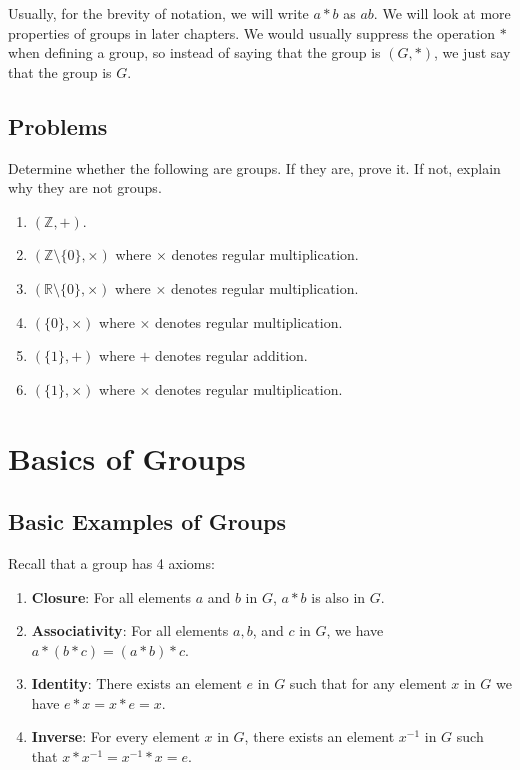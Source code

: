 Usually, for the brevity of notation, we will write $a \ast b$ as $ab$. We will look at more properties of groups in later chapters. We would usually suppress the operation $\ast$ when defining a group, so instead of saying that the group is $(G, \ast)$, we just say that the group is $G$.

\newpage

\section{Problems}
\begin{problem}
Determine whether the following are groups. If they are, prove it. If not, explain why they are not groups.
\begin{enumerate}[label=(\alph*)]
    \item $(\mathbb{Z}, +)$.
    \item $(\mathbb{Z} \setminus \{0\}, \times)$ where $\times$ denotes regular multiplication.
    \item $(\mathbb{R} \setminus \{0\}, \times)$ where $\times$ denotes regular multiplication.
    \item $(\{0\}, \times)$ where $\times$ denotes regular multiplication.
    \item $(\{1\}, +)$ where $+$ denotes regular addition.
    \item $(\{1\}, \times)$ where $\times$ denotes regular multiplication.
\end{enumerate}
\end{problem}

\chapter{Basics of Groups}
\section{Basic Examples of Groups}
Recall that a group has 4 axioms:
\begin{enumerate}
    \item \textbf{Closure}: For all elements $a$ and $b$ in $G$, $a \ast b$ is also in $G$.
    \item \textbf{Associativity}: For all elements $a, b$, and $c$ in $G$, we have $a \ast (b \ast c) = (a \ast b) \ast c$.
    \item \textbf{Identity}: There exists an element $e$ in $G$ such that for any element $x$ in $G$ we have $e \ast x = x \ast e = x$.
    \item \textbf{Inverse}: For every element $x$ in $G$, there exists an element $x^{-1}$ in $G$ such that $x \ast x^{-1} = x^{-1} \ast x = e$.
\end{enumerate}

